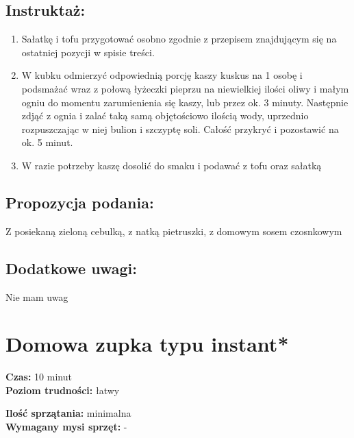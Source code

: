 \documentclass[a4paper,10pt]{book}
\begin{document}
\vspace{0.5cm} 

\section*{Instruktaż:}
\begin{enumerate}
    \item Sałatkę i tofu przygotować osobno zgodnie z przepisem znajdującym się na ostatniej pozycji w spisie treści.
    \item W kubku odmierzyć odpowiednią porcję kaszy kuskus na 1 osobę i podsmażać wraz z połową łyżeczki pieprzu na niewielkiej ilości oliwy i małym ogniu do momentu zarumienienia się kaszy, lub przez ok. 3 minuty. Następnie zdjąć z ognia i zalać taką samą objętościowo ilością wody, uprzednio rozpuszczając w niej bulion i szczyptę soli. Całość przykryć i pozostawić na ok. 5 minut. 
    \item W razie potrzeby kaszę dosolić do smaku i podawać z tofu oraz sałatką
\end{enumerate}

\vspace{0.5cm} 

\small
\section*{Propozycja podania:}
Z posiekaną zieloną cebulką, z natką pietruszki, z domowym sosem czosnkowym

\vspace{0.3cm}

\section*{Dodatkowe uwagi:}
Nie mam uwag


\chapter{Domowa zupka typu instant*}

\vspace{0.1cm}
\small
\begin{minipage}{0.45\textwidth}
    \noindent \textbf{Czas:} 10 minut \\
    \textbf{Poziom trudności:} łatwy
\end{minipage}
\begin{minipage}{0.45\textwidth}
    \noindent \textbf{Ilość sprzątania:} minimalna\\
    \textbf{Wymagany mysi sprzęt:} -
\end{minipage}
\normalsize
\vspace{0.5cm}
\end{document}
